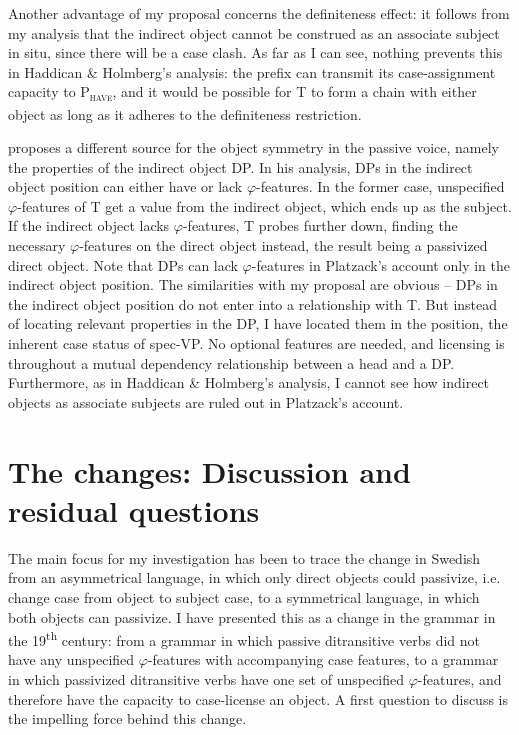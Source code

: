 \documentclass[output=paper]{langscibook}
\begin{document}
Another advantage of my proposal concerns the definiteness effect: it follows from my analysis that the indirect object cannot be construed as an associate subject in situ, since there will be a case clash. As far as I can see, nothing prevents this in Haddican \& Holmberg’s analysis: the prefix can transmit its case-assignment capacity to P\textsc{\textsubscript{have}}, and it would be possible for T to form a chain with either object as long as it adheres to the definiteness restriction.



\citet{Platzack2005,Platzack2006} proposes a different source for the object symmetry in the passive voice, namely the properties of the indirect object DP. In his analysis, DPs in the indirect object position can either have or lack $\varphi ${}-features. In the former case, unspecified $\varphi ${}-features of T get a value from the indirect object, which ends up as the subject. If the indirect object lacks $\varphi ${}-features, T probes further down, finding the necessary $\varphi ${}-features on the direct object instead, the result being a passivized direct object. Note that DPs can lack $\varphi ${}-features in Platzack’s account only in the indirect object position. The similarities with my proposal are obvious – DPs in the indirect object position do not enter into a relationship with T. But instead of locating relevant properties in the DP, I have located them in the position, the inherent case status of spec-VP. No optional features are needed, and licensing is throughout a mutual dependency relationship between a head and a DP. Furthermore, as in Haddican \& Holmberg’s analysis, I cannot see how indirect objects as associate subjects are ruled out in Platzack’s account.


\section{The changes: Discussion and residual questions}\label{sec:falk:5}


The main focus for my investigation has been to trace the change in Swedish from an asymmetrical language, in which only direct objects could passivize, i.e. change case from object to subject case, to a symmetrical language, in which both objects can passivize. I have presented this as a change in the grammar in the 19\textsuperscript{th} century: from a grammar in which passive ditransitive verbs did not have any unspecified $\varphi ${}-features with accompanying case features, to a grammar in which passivized ditransitive verbs have one set of unspecified $\varphi ${}-features, and therefore have the capacity to case-license an object. A first question to discuss is the impelling force behind this change.
\end{document}
